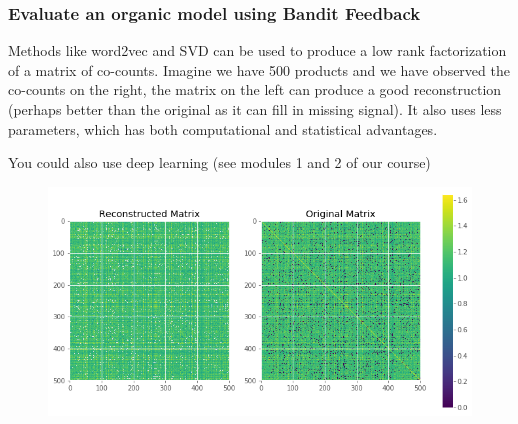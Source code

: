 






\begin{frame}
  \frametitle{Evaluate an organic model using Bandit Feedback}

  Methods like word2vec and SVD can be used to produce a low rank factorization of a matrix of co-counts.  Imagine we have 500 products and we have observed the co-counts on the right, the matrix on the left can produce a good reconstruction (perhaps better than the original as it can fill in missing signal).  It also uses less parameters, which has both computational and statistical advantages.

  You could also use deep learning (see modules 1 and 2 of our course)

  \begin{figure}[h!]
\includegraphics[scale=0.4]{images/evalorganicwithbandit0.png}
\centering
\label{motex1}
\end{figure}
\end{frame}



